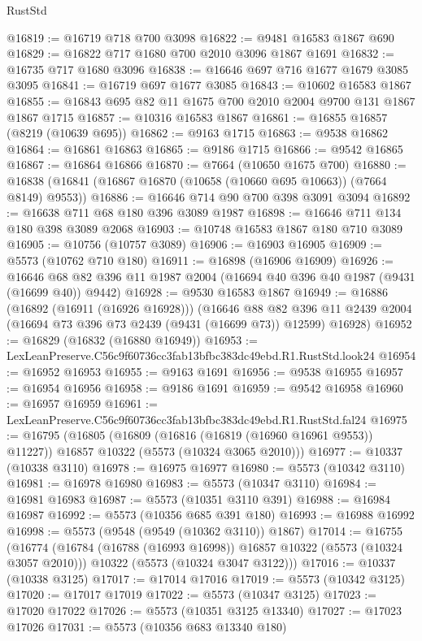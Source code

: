 \begin{lexlean}{RustStd}
\begin{coremodule}
@16819 := @16719 @718 @700 @3098
@16822 := @9481 @16583 @1867 @690
@16829 := @16822 @717 @1680 @700 @2010 @3096 @1867 @1691
@16832 := @16735 @717 @1680 @3096
@16838 := @16646 @697 @716 @1677 @1679 @3085 @3095
@16841 := @16719 @697 @1677 @3085
@16843 := @10602 @16583 @1867
@16855 := @16843 @695 @82 @11 @1675 @700 @2010 @2004 @9700 @131 @1867 @1867 @1715
@16857 := @10316 @16583 @1867
@16861 := @16855 @16857 (@8219 (@10639 @695))
@16862 := @9163 @1715
@16863 := @9538 @16862
@16864 := @16861 @16863
@16865 := @9186 @1715
@16866 := @9542 @16865
@16867 := @16864 @16866
@16870 := @7664 (@10650 @1675 @700)
@16880 := @16838 (@16841 (@16867 @16870 (@10658 (@10660 @695 @10663)) (@7664 @8149) @9553))
@16886 := @16646 @714 @90 @700 @398 @3091 @3094
@16892 := @16638 @711 @68 @180 @396 @3089 @1987
@16898 := @16646 @711 @134 @180 @398 @3089 @2068
@16903 := @10748 @16583 @1867 @180 @710 @3089
@16905 := @10756 (@10757 @3089)
@16906 := @16903 @16905
@16909 := @5573 (@10762 @710 @180)
@16911 := @16898 (@16906 @16909)
@16926 := @16646 @68 @82 @396 @11 @1987 @2004 (@16694 @40 @396 @40 @1987 (@9431 (@16699 @40)) @9442)
@16928 := @9530 @16583 @1867
@16949 := @16886
    (@16892 (@16911 (@16926 @16928)))
    (@16646
      @88
      @82
      @396
      @11
      @2439
      @2004
      (@16694 @73 @396 @73 @2439 (@9431 (@16699 @73)) @12599)
      @16928)
@16952 := @16829 (@16832 (@16880 @16949))
@16953 := LexLeanPreserve.C56c9f60736cc3fab13bfbc383dc49ebd.R1.RustStd.look24
@16954 := @16952 @16953
@16955 := @9163 @1691
@16956 := @9538 @16955
@16957 := @16954 @16956
@16958 := @9186 @1691
@16959 := @9542 @16958
@16960 := @16957 @16959
@16961 := LexLeanPreserve.C56c9f60736cc3fab13bfbc383dc49ebd.R1.RustStd.fal24
@16975 := @16795
    (@16805
      (@16809 (@16816 (@16819 (@16960 @16961 @9553)) @11227))
      @16857
      @10322
      (@5573 (@10324 @3065 @2010)))
@16977 := @10337 (@10338 @3110)
@16978 := @16975 @16977
@16980 := @5573 (@10342 @3110)
@16981 := @16978 @16980
@16983 := @5573 (@10347 @3110)
@16984 := @16981 @16983
@16987 := @5573 (@10351 @3110 @391)
@16988 := @16984 @16987
@16992 := @5573 (@10356 @685 @391 @180)
@16993 := @16988 @16992
@16998 := @5573 (@9548 (@9549 (@10362 @3110)) @1867)
@17014 := @16755
    (@16774
      (@16784 (@16788 (@16993 @16998)) @16857 @10322 (@5573 (@10324 @3057 @2010)))
      @10322
      (@5573 (@10324 @3047 @3122)))
@17016 := @10337 (@10338 @3125)
@17017 := @17014 @17016
@17019 := @5573 (@10342 @3125)
@17020 := @17017 @17019
@17022 := @5573 (@10347 @3125)
@17023 := @17020 @17022
@17026 := @5573 (@10351 @3125 @13340)
@17027 := @17023 @17026
@17031 := @5573 (@10356 @683 @13340 @180)

\end{coremodule}
\end{lexlean}
